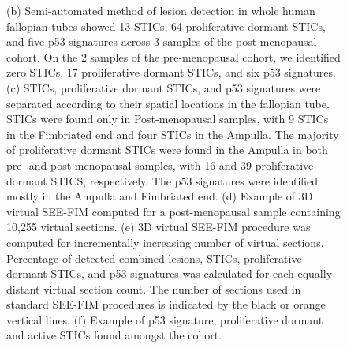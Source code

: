 \begin{refsection}
    \begin{figure}[h!]
        \ContinuedFloat
        \captionsetup{font=small}
        \caption[]{(b) Semi-automated method of lesion detection in whole human fallopian tubes showed 13 STICs, 64 proliferative dormant STICs, and five p53 signatures across 3 samples of the post-menopausal cohort. On the 2 samples of the pre-menopausal cohort, we identified zero STICs, 17 proliferative dormant STICs, and six p53 signatures. (c) STICs, proliferative dormant STICs, and p53 signatures were separated according to their spatial locations in the fallopian tube. STICs were found only in Post-menopausal samples, with 9 STICs in the Fimbriated end and four STICs in the Ampulla. The majority of proliferative dormant STICs were found in the Ampulla in both pre- and post-menopausal samples, with 16 and 39 proliferative dormant STICS, respectively. The p53 signatures were identified mostly in the Ampulla and Fimbriated end. (d) Example of 3D virtual SEE-FIM computed for a post-menopausal sample containing 10,255 virtual sections. (e) 3D virtual SEE-FIM procedure was computed for incrementally increasing number of virtual sections. Percentage of detected combined lesions, STICs, proliferative dormant STICs, and p53 signatures was calculated for each equally distant virtual section count. The number of sections used in standard SEE-FIM procedures is indicated by the black or orange vertical lines. (f) Example of p53 signature, proliferative dormant and active STICs found amongst the cohort.}
    \end{figure}
    

\end{refsection}
